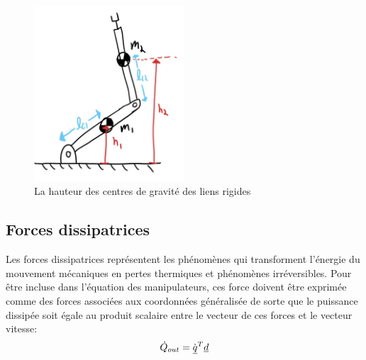 \begin{figure}[ht]
	\centering
		\includegraphics[width=0.50\textwidth]{fig/gravitycg.jpg}
	\caption{La hauteur des centres de gravité des liens rigides}%
	\label{fig:gravitycg}
\end{figure}



\newpage
\subsection{Forces dissipatrices}

Les forces dissipatrices représentent les phénomènes qui transforment l'énergie du mouvement mécaniques en pertes thermiques et phénomènes irréversibles. Pour être incluse dans l'équation des manipulateurs, ces force doivent être exprimée comme des forces associées aux coordonnées généralisée de sorte que le puissance dissipée soit égale au produit scalaire entre le vecteur de ces forces et le vecteur vitesse:
\begin{align}
\dot{Q}_{out} = \dot{\underline{q}}^T \underline{d}
\end{align}

